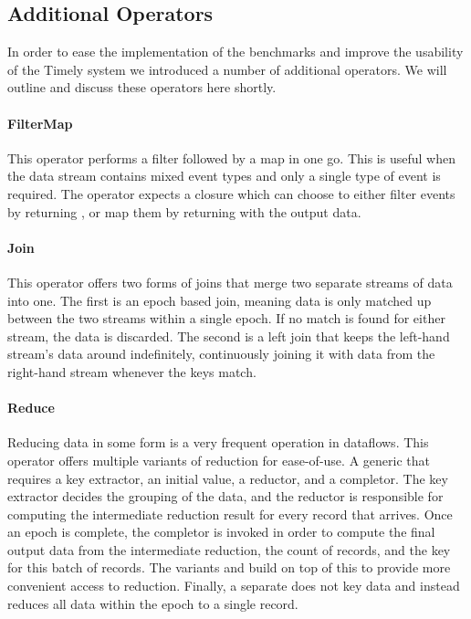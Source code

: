 \subsection{Additional Operators}
In order to ease the implementation of the benchmarks and improve the usability of the Timely system we introduced a number of additional operators. We will outline and discuss these operators here shortly.

\paragraph{FilterMap}
This operator performs a filter followed by a map in one go. This is useful when the data stream contains mixed event types and only a single type of event is required. The operator expects a closure which can choose to either filter events by returning , or map them by returning  with the output data.

\paragraph{Join}
This operator offers two forms of joins that merge two separate streams of data into one. The first is an epoch based join, meaning data is only matched up between the two streams within a single epoch. If no match is found for either stream, the data is discarded. The second is a left join that keeps the left-hand stream's data around indefinitely, continuously joining it with data from the right-hand stream whenever the keys match.

\paragraph{Reduce}
Reducing data in some form is a very frequent operation in dataflows. This operator offers multiple variants of reduction for ease-of-use. A generic  that requires a key extractor, an initial value, a reductor, and a completor. The key extractor decides the grouping of the data, and the reductor is responsible for computing the intermediate reduction result for every record that arrives. Once an epoch is complete, the completor is invoked in order to compute the final output data from the intermediate reduction, the count of records, and the key for this batch of records. The variants  and  build on top of this to provide more convenient access to reduction. Finally, a separate  does not key data and instead reduces all data within the epoch to a single record.

